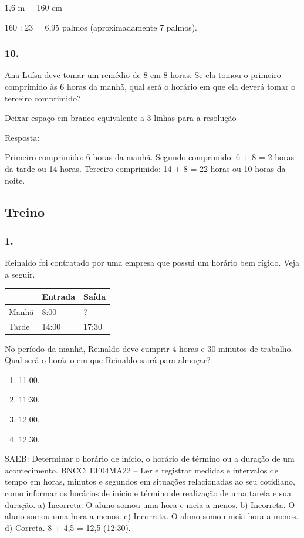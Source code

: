 \begin{enumerate}
\begin{escolha}
\begin{enumerate}
\begin{itemize}
\begin{itemize}
\begin{escolha}
1,6 m = 160 cm

160 : 23 = 6,95 palmos (aproximadamente 7 palmos).

\subsubsection{10.}\label{section-48}

Ana Luísa deve tomar um remédio de 8 em 8 horas. Se ela tomou o primeiro
comprimido às 6 horas da manhã, qual será o horário em que ela deverá tomar
o terceiro comprimido?

Deixar espaço em branco equivalente a 3 linhas para a resolução

Resposta:

Primeiro comprimido: 6 horas da manhã.
Segundo comprimido: 6 + 8 = 2 horas da tarde ou 14 horas.
Terceiro comprimido: 14 + 8 = 22 horas ou 10 horas da noite.

\subsection{Treino}\label{treino-3}

\subsubsection{1.}\label{section-49}

Reinaldo foi contratado por uma empresa que possui um horário bem rígido.
Veja a seguir.

\begin{longtable}[]{@{}lll@{}}
\toprule
& Entrada & Saída\tabularnewline
\midrule
\endhead
Manhã & 8:00 & ?\tabularnewline
Tarde & 14:00 & 17:30\tabularnewline
\bottomrule
\end{longtable}


No período da manhã, Reinaldo deve
cumprir 4 horas e 30 minutos de trabalho. Qual será o horário em que
Reinaldo sairá para almoçar?

\begin{enumerate}
\def\labelenumi{\alph{enumi})}
\item
  11:00.
\item
  11:30.
\item
  12:00.
\item
  12:30.
\end{enumerate}

SAEB: Determinar o horário de início, o horário de término ou a duração de um acontecimento.
BNCC: EF04MA22 -- Ler e registrar medidas e intervalos de tempo em horas, minutos e segundos em
situações relacionadas ao seu cotidiano, como informar os horários de início e término de realização
de uma tarefa e sua duração.
a) Incorreta. O aluno somou uma hora e meia a menos.
b) Incorreta. O aluno somou uma hora a menos.
c) Incorreta. O aluno somou meia hora a menos.
d) Correta. 8 + 4,5 = 12,5 (12:30).



\end{escolha}
\end{itemize}
\end{itemize}
\end{enumerate}
\end{escolha}
\end{enumerate}
